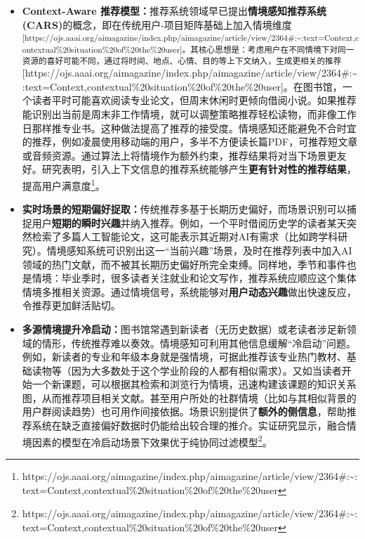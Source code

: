 \documentclass[
  letterpaper,
]{scrbook}
\begin{document}
\begin{itemize}
\item
  \textbf{Context-Aware
  推荐模型：}推荐系统领域早已提出\textbf{情境感知推荐系统(CARS)}的概念，即在传统用户-项目矩阵基础上加入情境维度\textsuperscript{{[}https://ojs.aaai.org/aimagazine/index.php/aimagazine/article/view/2364\#:\textasciitilde:text=Context,contextual\%20situation\%20of\%20the\%20user{]}。其核心思想是：考虑用户在不同情境下对同一资源的喜好可能不同，通过将时间、地点、心情、目的等上下文纳入，生成更相关的推荐}{[}https://ojs.aaai.org/aimagazine/index.php/aimagazine/article/view/2364\#:\textasciitilde:text=Context,contextual\%20situation\%20of\%20the\%20user{]}。在图书馆，一个读者平时可能喜欢阅读专业论文，但周末休闲时更倾向借阅小说。如果推荐能识别出当前是周末非工作情境，就可以调整策略推荐轻松读物，而非像工作日那样推专业书。这种做法提高了推荐的接受度。情境感知还能避免不合时宜的推荐，例如凌晨使用移动端的用户，多半不方便读长篇PDF，可推荐短文章或音频资源。通过算法上将情境作为额外约束，推荐结果将对当下场景更友好。研究表明，引入上下文信息的推荐系统能够产生\textbf{更有针对性的推荐结果}，提高用户满意度\footnote{https://ojs.aaai.org/aimagazine/index.php/aimagazine/article/view/2364\#:\textasciitilde:text=Context,contextual\%20situation\%20of\%20the\%20user}。
\item
  \textbf{实时场景的短期偏好捉取：}传统推荐多基于长期历史偏好，而场景识别可以捕捉用户\textbf{短期的瞬时兴趣}并纳入推荐。例如，一个平时借阅历史学的读者某天突然检索了多篇人工智能论文，这可能表示其近期对AI有需求（比如跨学科研究）。情境感知系统可识别出这一``当前兴趣''场景，及时在推荐列表中加入AI领域的热门文献，而不被其长期历史偏好所完全束缚。同样地，季节和事件也是情境：毕业季时，很多读者关注就业和论文写作，推荐系统应顺应这个集体情境多推相关资源。通过情境信号，系统能够对\textbf{用户动态兴趣}做出快速反应，令推荐更加鲜活贴切。
\item
  \textbf{多源情境提升冷启动：}图书馆常遇到新读者（无历史数据）或老读者涉足新领域的情形，传统推荐难以奏效。情境感知可利用其他信息缓解``冷启动''问题。例如，新读者的专业和年级本身就是强情境，可据此推荐该专业热门教材、基础读物等（因为大多数处于这个学业阶段的人都有相似需求）。又如当读者开始一个新课题，可以根据其检索和浏览行为情境，迅速构建该课题的知识关系图，从而推荐项目相关文献。甚至用户所处的社群情境（比如与其相似背景的用户群阅读趋势）也可用作间接依据。场景识别提供了\textbf{额外的侧信息}，帮助推荐系统在缺乏直接偏好数据时仍能给出较合理的推介。实证研究显示，融合情境因素的模型在冷启动场景下效果优于纯协同过滤模型\footnote{https://ojs.aaai.org/aimagazine/index.php/aimagazine/article/view/2364\#:\textasciitilde:text=Context,contextual\%20situation\%20of\%20the\%20user}。

\end{itemize}
\end{document}
